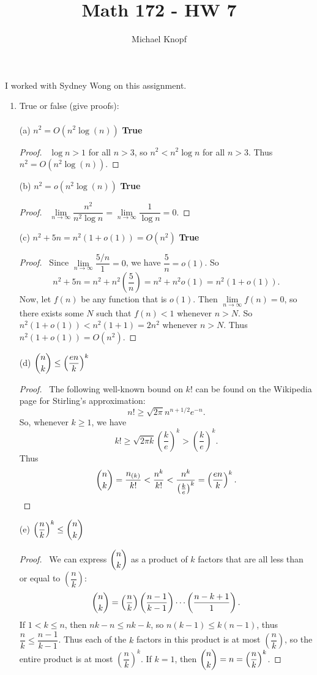 \documentclass[12pt]{article}
\begin{document}
\title{Math 172 - HW 7}
\author{Michael Knopf}
 
\maketitle

\noindent I worked with Sydney Wong on this assignment.

\begin{enumerate}[leftmargin=0cm,itemindent=.5cm,labelwidth=\itemindent,labelsep=0cm,align=left]
\item True or false (give proofs):\\ \\
(a) $n^2 = O(n^2 \log (n))$ \textbf{True}
\begin{proof}
\ $\log n > 1$ for all $n > 3$, so $n^2 < n^2 \log n$ for all $n > 3$.  Thus $n^2 = O(n^2 \log (n))$.
\end{proof}
\noindent (b) $n^2 = o(n^2\log(n))$ \textbf{True}
\begin{proof}
\ $\lim\limits_{n \rightarrow \infty} \dfrac{n^2}{n^2 \log n} = \lim\limits_{n \rightarrow \infty} \dfrac{1}{\log n} = 0$.
\end{proof}
\noindent (c) $n^2 + 5n = n^2(1+o(1)) = O(n^2)$ \textbf{True}
\begin{proof}
\ Since $\lim\limits_{n \rightarrow \infty} \dfrac{5/n}{1} = 0$, we have $\dfrac5n = o(1)$.  So $$n^2 + 5n = n^2 + n^2 \left(\frac5n \right) = n^2 + n^2o(1) = n^2(1+o(1)).$$
Now, let $f(n)$ be any function that is $o(1)$.  Then $\lim\limits_{n \rightarrow \infty} f(n) = 0$, so there exists some $N$ such that $f(n) < 1$ whenever $n > N$.  So $n^2(1+o(1)) < n^2(1+1) = 2n^2$ whenever $n > N$.  Thus $n^2(1+o(1)) = O(n^2)$.
\end{proof}
\noindent (d) $\dbinom{n}{k} \leq \left( \dfrac{en}{k} \right)^k$
\begin{proof}
\ The following well-known bound on $k!$ can be found on the Wikipedia page for Stirling's approximation:
$$n! \geq \sqrt{2\pi} n^{n+1/2} e^{-n}.$$
So, whenever $k \geq 1$, we have
$$
k! \geq \sqrt{2\pi k} \left( \frac{k}{e} \right)^k > \left( \frac{k}{e} \right)^k.
$$
Thus
$$
\dbinom{n}{k} = \dfrac{n_{(k)}}{k!} < \frac{n^k}{k!} < \frac{n^k}{\left( \frac{k}{e} \right)^k} = \left( \frac{en}{k} \right)^k.
$$
\end{proof}
\noindent (e) $\left( \dfrac{n}{k} \right)^k \leq \dbinom{n}{k}$
\begin{proof}
\ We can express $\dbinom{n}{k}$ as a product of $k$ factors that are all less than or equal to $\left( \dfrac{n}{k} \right)$:
$$
\dbinom{n}{k} = \left( \dfrac{n}{k} \right)\left( \dfrac{n-1}{k-1} \right) \cdots \left( \dfrac{n-k+1}{1} \right).
$$
If $1 < k \leq n$, then $nk - n \leq nk - k$, so $n(k-1) \leq k(n-1)$, thus $\dfrac{n}{k} \leq \dfrac{n-1}{k-1}$.  Thus each of the $k$ factors in this product is at most $\left( \dfrac{n}{k} \right)$, so the entire product is at most $\left( \dfrac{n}{k} \right)^k$.  If $k = 1$, then $\dbinom{n}{k} = n = \left( \dfrac{n}{k} \right)^k$.
\end{proof}


\end{enumerate}
\end{document}
